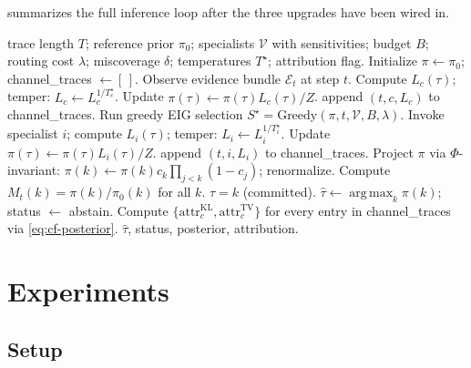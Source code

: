 \documentclass[11pt,a4paper]{article}
\newcommand{\KL}{\mathrm{KL}}
\newcommand{\TV}{\mathrm{TV}}
\newcommand{\Ecal}{\mathcal{E}}
\newcommand{\Vcal}{\mathcal{V}}
\DeclareMathOperator*{\argmax}{arg\,max}
\theoremstyle{plain}
\theoremstyle{definition}
\theoremstyle{remark}
\begin{document}
 summarizes the full inference loop after the three
upgrades have been wired in.

\begin{algorithm}[t]
\caption{\textsc{Prism} inference with e-process stopping, joint
calibration, and counterfactual attribution.}
\label{alg:prism}
\begin{algorithmic}[1]
\Require trace length $T$; reference prior $\pi_0$; specialists
  $\Vcal$ with sensitivities; budget $B$; routing cost $\lambda$;
  miscoverage $\delta$; temperatures $T^\star$; attribution flag.
\State Initialize $\pi \leftarrow \pi_0$;
  channel\_traces $\leftarrow [\,]$.
  \State Observe evidence bundle $\Ecal_t$ at step $t$.
    \State Compute $L_c(\tau)$; temper:
      $L_c \leftarrow L_c^{1/T^\star_c}$.
    \State Update $\pi(\tau) \leftarrow \pi(\tau) L_c(\tau) / Z$.
     append $(t,c,L_c)$ to channel\_traces.
    \EndIf
  \EndFor
  \State Run greedy EIG selection
    $S^\star = \text{Greedy}(\pi, t, \Vcal, B, \lambda)$.
    \State Invoke specialist $i$; compute $L_i(\tau)$; temper:
      $L_i \leftarrow L_i^{1/T^\star_i}$.
    \State Update $\pi(\tau) \leftarrow \pi(\tau) L_i(\tau) / Z$.
     append $(t,i,L_i)$ to channel\_traces.
    \EndIf
  \EndFor
  \State Project $\pi$ via $\Phi$-invariant:
    $\pi(k) \leftarrow \pi(k) c_k \prod_{j<k}(1-c_j)$; renormalize.
  \State Compute $M_t(k) = \pi(k)/\pi_0(k)$ for all $k$.
    \State \Return $\hat\tau = k$ (committed).
  \EndIf
\EndFor
\State $\hat\tau \leftarrow \argmax_k \pi(k)$; status $\leftarrow$
  abstain.
  \State Compute
    $\{\mathrm{attr}_c^{\KL}, \mathrm{attr}_c^{\TV}\}$ for every
    entry in channel\_traces via \eqref{eq:cf-posterior}.
\EndIf
\State \Return $\hat\tau$, status, posterior, attribution.
\end{algorithmic}
\end{algorithm}

\section{Experiments}
\label{sec:experiments}

\subsection{Setup}
\label{sec:exp-setup}
\end{document}
